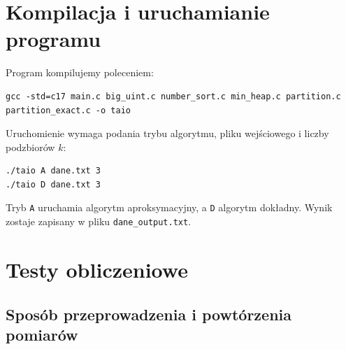 \documentclass[11pt]{article}
\begin{document}
\section{Kompilacja i uruchamianie programu}

Program kompilujemy poleceniem:
\begin{verbatim}
gcc -std=c17 main.c big_uint.c number_sort.c min_heap.c partition.c partition_exact.c -o taio
\end{verbatim}

Uruchomienie wymaga podania trybu algorytmu, pliku wejściowego
i liczby podzbiorów \(k\):
\begin{verbatim}
./taio A dane.txt 3
./taio D dane.txt 3
\end{verbatim}

Tryb \texttt{A} uruchamia algorytm aproksymacyjny,
a \texttt{D} algorytm dokładny. Wynik zostaje zapisany
w pliku \texttt{dane\_output.txt}.

\section{Testy obliczeniowe}

\subsection{Sposób przeprowadzenia i powtórzenia pomiarów}
\end{document}

